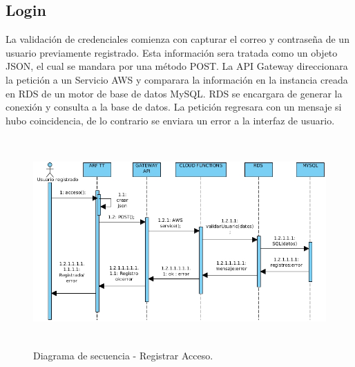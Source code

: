 \subsection{Login}
La validación de credenciales comienza con capturar el correo y contraseña  de un usuario previamente registrado. Esta información sera tratada como un objeto JSON, el cual se mandara por una método POST. La API Gateway direccionara la petición a un Servicio AWS y  comparara la información en la instancia creada en RDS de un motor de base de datos MySQL. RDS se encargara de generar la conexión y consulta a la base de datos. La petición regresara con un mensaje si hubo coincidencia, de lo contrario se enviara un error a la interfaz de usuario.
\begin{figure}[h!]
	\centering
	\includegraphics[width=14cm,height=8cm]{imagenes/analisis/DSacceso.jpg}
	\caption{Diagrama de secuencia - Registrar Acceso.}
	\label{fig:analogo}
\end{figure} 